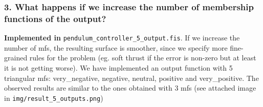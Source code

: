 \documentclass{article}[11pt]
\begin{document}

\subsubsection*{3. What happens if we increase the number of membership functions of the output? }
\textbf{Implemented in} \texttt{pendulum\_controller\_5\_output.fis}. If we increase the number of mfs, the resulting surface is smoother, since we specify more fine-grained rules for the problem (eg. soft thrust if the error is non-zero but at least it is not getting worse). We have implemented an output function with 5 triangular mfs: very\_negative, negative, neutral, positive and very\_positive. The observed results are similar to the ones obtained with 3 mfs (see attached image in \texttt{img/result\_5\_outputs.png})
\end{document}
